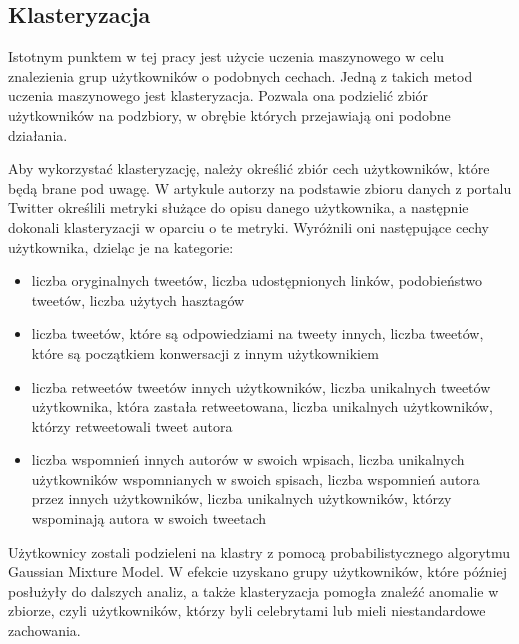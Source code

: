 \documentclass[polish,12pt]{aghthesis}
\begin{document}
\subsection{Klasteryzacja}
Istotnym punktem w tej pracy jest użycie uczenia maszynowego w celu znalezienia grup użytkowników o podobnych cechach. Jedną z takich metod uczenia maszynowego jest klasteryzacja. Pozwala ona podzielić zbiór użytkowników na podzbiory, w obrębie których przejawiają oni podobne działania. 

Aby wykorzystać klasteryzację, należy określić zbiór cech użytkowników, które będą brane pod uwagę. W artykule \cite{authority} autorzy na podstawie zbioru danych z portalu Twitter określili metryki służące do opisu danego użytkownika, a następnie dokonali klasteryzacji w oparciu o te metryki. Wyróżnili oni następujące cechy użytkownika, dzieląc je na kategorie:
\begin{itemize}
    \item liczba oryginalnych tweetów, liczba udostępnionych linków, podobieństwo tweetów, liczba użytych hasztagów
    \item liczba tweetów, które są odpowiedziami na tweety innych, liczba tweetów, które są początkiem konwersacji z innym użytkownikiem
    \item liczba retweetów tweetów innych użytkowników, liczba unikalnych tweetów użytkownika, która zastała retweetowana, liczba unikalnych użytkowników, którzy retweetowali tweet autora
    \item liczba wspomnień innych autorów w swoich wpisach, liczba unikalnych użytkowników wspomnianych w swoich spisach, liczba wspomnień autora przez innych użytkowników, liczba unikalnych użytkowników, którzy wspominają autora w swoich tweetach
\end{itemize}

Użytkownicy zostali podzieleni na klastry z pomocą probabilistycznego algorytmu Gaussian Mixture Model. W efekcie uzyskano grupy użytkowników, które później posłużyły do dalszych analiz, a także klasteryzacja pomogła znaleźć anomalie w zbiorze, czyli użytkowników, którzy byli celebrytami lub mieli niestandardowe zachowania.

\vspace{5mm}
\end{document}
